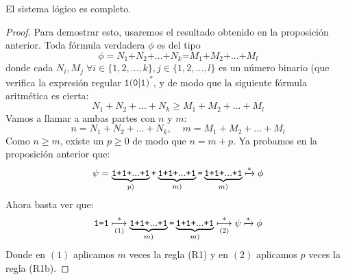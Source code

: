 \begin{proposicion}\label{prop:ap-restr-arr}
El sistema lógico  es completo.
\end{proposicion}
\begin{proof}
Para demostrar esto, usaremos el resultado obtenido en la proposición anterior. Toda fórmula verdadera $\phi$ es del tipo
$$\phi=N_1\texttt{+}N_2\texttt{+}...\texttt{+}N_k\texttt{=}M_1\texttt{+}M_2\texttt{+}...\texttt{+}M_l$$
donde cada $N_i, M_j\;\forall i\in\{1, 2, ..., k\}, j\in\{1, 2, ..., l\}$ es un número binario (que verifica la expresión regular $\texttt{1(0|1)}^\texttt{*}$, y de modo que la siguiente fórmula aritmética es cierta:
$$N_1+N_2+...+N_k\geq M_1+M_2+...+M_l$$
Vamos a llamar a ambas partes con $n$ y $m$:
$$n=N_1+N_2+...+N_k, \;\;\;\;m=M_1+M_2+...+M_l$$
Como $n\geq m$, existe un $p\geq 0$ de modo que $n=m+p$. Ya probamos en la proposición anterior que:
$$\psi=\underbrace{\texttt{1}\texttt{+}\texttt{1}\texttt{+}...\texttt{+}\texttt{1}}_{p)}\texttt{+}\underbrace{\texttt{1}\texttt{+}\texttt{1}\texttt{+}...\texttt{+}\texttt{1}}_{m)}\texttt{=}\underbrace{\texttt{1}\texttt{+}\texttt{1}\texttt{+}...\texttt{+}\texttt{1}}_{m)}\xmapsto{*}\phi$$
Ahora basta ver que:
$$\texttt{1=1}\underset{(1)}{\overset{*}{\longmapsto}}\underbrace{\texttt{1}\texttt{+}\texttt{1}\texttt{+}...\texttt{+}\texttt{1}}_{m)}\texttt{=}\underbrace{\texttt{1}\texttt{+}\texttt{1}\texttt{+}...\texttt{+}\texttt{1}}_{m)}\underset{(2)}{\overset{*}{\longmapsto}}\psi\xmapsto{*}\phi$$
Donde en $(1)$ aplicamos $m$ veces la regla (R1) y en $(2)$ aplicamos $p$ veces la regla (R1b).
\end{proof}

\endinput

